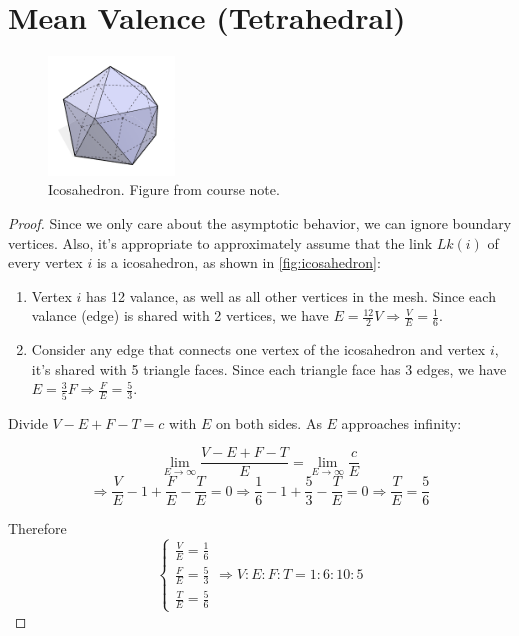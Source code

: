 \section{Mean Valence (Tetrahedral)}
    \begin{figure}[h]
        \centering
        \includegraphics[width=0.3\textwidth]{figures/A0/icosahedron.png}
        \caption{Icosahedron. Figure from course note.}
        \label{fig:icosahedron}
    \end{figure}
    \begin{proof}
        Since we only care about the asymptotic behavior, we can ignore boundary vertices. Also, it's appropriate to approximately assume that the link $Lk(i)$ of every vertex $i$ is a icosahedron, as shown in \autoref{fig:icosahedron}:

        \begin{enumerate}
            \item Vertex $i$ has 12 valance, as well as all other vertices in the mesh. Since each valance (edge) is shared with 2 vertices, we have $E = \frac{12}{2} V \Rightarrow \frac{V}{E} = \frac{1}{6}$.
            \item Consider any edge that connects one vertex of the icosahedron and vertex $i$, it's shared with 5 triangle faces. Since each triangle face has 3 edges, we have $E = \frac{3}{5} F \Rightarrow \frac{F}{E} = \frac{5}{3}$.
        \end{enumerate}
        
        Divide $V - E + F - T = c$ with $E$ on both sides. As $E$ approaches infinity:

        \begin{equation}
            \lim_{E \rightarrow \infty} \frac{V - E + F - T}{E} = \lim_{E \rightarrow \infty} \frac{c}{E}
        \end{equation}
        \begin{equation}
            \Rightarrow \frac{V}{E} - 1 + \frac{F}{E} - \frac{T}{E} = 0
            \Rightarrow \frac{1}{6} - 1 + \frac{5}{3} - \frac{T}{E} = 0
            \Rightarrow \frac{T}{E} = \frac{5}{6}
        \end{equation}

        Therefore
        \begin{equation}
            \begin{cases}
                \frac{V}{E} = \frac{1}{6}\\
                \frac{F}{E} = \frac{5}{3}\\
                \frac{T}{E} = \frac{5}{6}
            \end{cases}
            \Rightarrow V:E:F:T = 1:6:10:5
        \end{equation}
    \end{proof}

